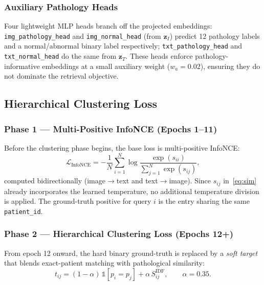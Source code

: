\documentclass[11pt, a4paper]{article}
\newcommand{\calL}{\mathcal{L}}
\newcommand{\vv}[1]{\mathbf{#1}}
\begin{document}
\subsubsection{Auxiliary Pathology Heads}

Four lightweight MLP heads branch off the projected embeddings:
\texttt{img\_pathology\_head} and \texttt{img\_normal\_head} (from
$\vv{z}_I$) predict 12 pathology labels and a normal/abnormal binary label
respectively; \texttt{txt\_pathology\_head} and \texttt{txt\_normal\_head}
do the same from $\vv{z}_T$.
These heads enforce pathology-informative embeddings at a small auxiliary
weight ($w_a\!=\!0.02$), ensuring they do not dominate the retrieval
objective.

\subsection{Hierarchical Clustering Loss}
\label{sec:loss}

\subsubsection{Phase 1 --- Multi-Positive InfoNCE (Epochs 1--11)}

Before the clustering phase begins, the base loss is multi-positive InfoNCE:
\begin{equation}
  \calL_{\mathrm{InfoNCE}} =
    -\frac{1}{N}\sum_{i=1}^{N}
    \log\frac{\exp(s_{ii})}{\sum_{j=1}^{N}\exp(s_{ij})},
  \label{eq:infonce}
\end{equation}
computed bidirectionally (image$\to$text and text$\to$image).
Since $s_{ij}$ in~\eqref{eq:sim} already incorporates the learned
temperature, no additional temperature division is applied.
The ground-truth positive for query $i$ is the entry sharing the same
\texttt{patient\_id}.

\subsubsection{Phase 2 --- Hierarchical Clustering Loss (Epochs 12+)}
\label{sec:cluster_loss}

From epoch 12 onward, the hard binary ground-truth is replaced by a
\emph{soft target} that blends exact-patient matching with pathological
similarity:
\begin{equation}
  t_{ij} = (1-\alpha)\,\mathbb{1}[p_i=p_j]
           + \alpha\,S^{\mathrm{IDF}}_{ij},
  \qquad \alpha = 0.35.
  \label{eq:softtarget}
\end{equation}
\end{document}

